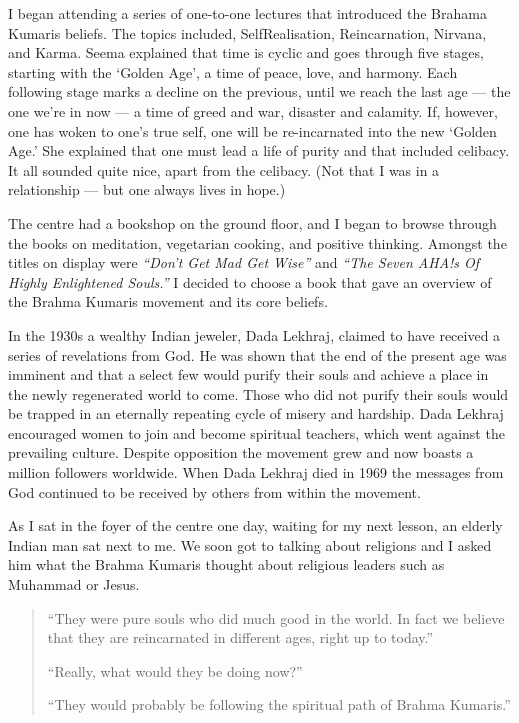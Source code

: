 \documentclass[12pt]{memoir}
\begin{document}
I began attending a series of one-to-one lectures
that introduced the Brahama Kumaris beliefs.
The topics included, Self\–Realisation, Reincarnation, Nirvana, and Karma.
Seema explained that time is cyclic and goes through five stages,
starting with the ‘Golden Age’, a time of peace, love, and harmony.
Each following stage marks a decline on the previous,
until we reach the last age — the one we’re in now —
a time of greed and war, disaster and calamity.
If, however, one has woken to one’s true self,
one will be re-incarnated into the new ‘Golden Age.’
She explained that one must lead a life of purity and that included celibacy.
It all sounded quite nice, apart from the celibacy.
(Not that I was in a relationship — but one always lives in hope.)

The centre had a bookshop on the ground floor,
and I began to browse through the books on meditation, vegetarian cooking,
and positive thinking.
Amongst the titles on display were \emph{“Don’t Get Mad Get Wise”}
and \emph{“The Seven AHA!s Of Highly Enlightened Souls.”}\@
I decided to choose a book that gave an overview
of the Brahma Kumaris movement and its core beliefs.

In the 1930s a wealthy Indian jeweler, Dada Lekhraj,
claimed to have received a series of revelations from God.
He was shown that the end of the present age was imminent
and that a select few would purify their souls
and achieve a place in the newly regenerated world to come.
Those who did not purify their souls would be trapped
in an eternally repeating cycle of misery and hardship.
Dada Lekhraj encouraged women to join and become spiritual teachers,
which went against the prevailing culture.
Despite opposition the movement grew
and now boasts a million followers worldwide.
When Dada Lekhraj died in 1969 the messages from God continued
to be received by others from within the movement.

As I sat in the foyer of the centre one day, waiting for my next lesson,
an elderly Indian man sat next to me.
We soon got to talking about religions and I asked him what the Brahma Kumaris
thought about religious leaders such as Muhammad or Jesus.

\begin{quote}
“They were pure souls who did much good in the world.
In fact we believe that they are reincarnated in different ages,
right up to today.”

“Really, what would they be doing now?”

“They would probably be following the spiritual path of Brahma Kumaris.”
\end{quote}
\end{document}

